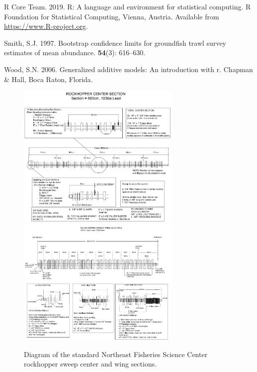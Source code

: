 \documentclass[]{article}
\begin{document}
\leavevmode\hypertarget{ref-R19}{}%
R Core Team. 2019. R: A language and environment for statistical
computing. R Foundation for Statistical Computing, Vienna, Austria.
Available from \url{https://www.R-project.org}.

\leavevmode\hypertarget{ref-smith97}{}%
Smith, S.J. 1997. Bootstrap confidence limits for groundfish trawl
survey estimates of mean abundance. \textbf{54}(3): 616--630.

\leavevmode\hypertarget{ref-wood06}{}%
Wood, S.N. 2006. Generalized additive models: An introduction with r.
Chapman \& Hall, Boca Raton, Florida.

\pagebreak

\begin{figure}
\caption{Diagram of the standard Northeast Fisheries Science Center rockhopper sweep center and wing sections.}\label{rockhopper_schematic}
\begin{center}
\includegraphics[width = 0.7\textwidth]{rockhopper_schematic_1.pdf}
\includegraphics[width = 0.7\textwidth]{rockhopper_schematic_2.pdf}
\end{center}
\end{figure}
\end{document}

